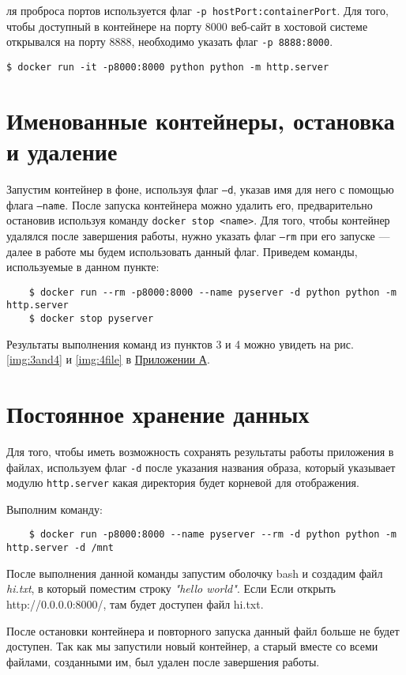 \documentclass[a4paper,14pt]{extarticle}
\begin{document}
ля проброса портов используется флаг \texttt{-p hostPort:containerPort}.
Для того, чтобы доступный в контейнере на порту 8000 веб-сайт в хостовой системе открывался на
порту 8888, необходимо указать флаг \texttt{-p 8888:8000}.

\begin{lstlisting}
$ docker run -it -p8000:8000 python python -m http.server
\end{lstlisting}

\section{Именованные контейнеры, остановка и удаление}
Запустим контейнер в фоне, используя флаг \texttt{--d}, указав имя для него с помощью флага \texttt{--name}. После запуска контейнера можно удалить его, предварительно остановив используя команду \texttt{docker stop <name>}. 
Для того, чтобы контейнер удалялся после завершения работы, нужно указать флаг \texttt{--rm} при его
запуске — далее в работе мы будем использовать данный флаг. Приведем команды, используемые в данном пункте:
\begin{lstlisting}
	$ docker run --rm -p8000:8000 --name pyserver -d python python -m http.server
	$ docker stop pyserver
\end{lstlisting}
Результаты выполнения команд из пунктов 3 и 4 можно увидеть на рис. \ref{img:3and4} и \ref{img:4file} в \hyperref[A]{Приложении А}.

\section{Постоянное хранение данных}
Для того, чтобы иметь возможность сохранять результаты работы приложения в файлах, используем флаг \texttt{-d} после указания названия образа, который указывает модулю \texttt{http.server} какая директория будет корневой для отображения.

Выполним команду:
\begin{lstlisting}
    $ docker run -p8000:8000 --name pyserver --rm -d python python -m http.server -d /mnt
\end{lstlisting}

После выполнения данной команды запустим оболочку bash и создадим файл \textit{hi.txt}, в который поместим строку \textit{"hello world"}. Если Если открыть http://0.0.0.0:8000/, там будет доступен файл hi.txt.

После остановки контейнера и повторного запуска данный файл больше не будет доступен. Так как мы запустили новый контейнер, а старый вместе со всеми файлами, созданными им, был удален после завершения работы.
\end{document}
